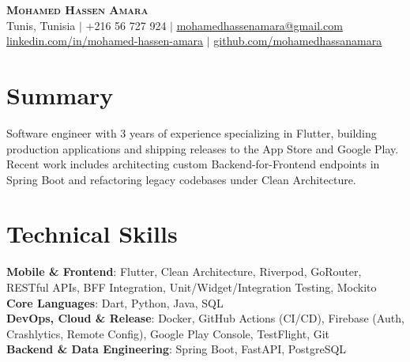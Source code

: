 \documentclass[letterpaper,10pt]{article}
\begin{document}
\begin{center}
    \textbf{\Huge \scshape \textcolor{primaryColor}{Mohamed Hassen Amara}} \\ \vspace{4pt}
    \small
{} Tunis, Tunisia \hspace{1pt}$|$\hspace{1pt}  +216 56 727 924 \hspace{1pt}$|$\hspace{1pt}  \href{mailto:mohamedhassenamara@gmail.com}{\underline{mohamedhassenamara@gmail.com}} \\ \vspace{2pt}
 \href{https://linkedin.com/in/mohamed-hassen-amara}{\underline{linkedin.com/in/mohamed-hassen-amara}} \hspace{1pt}$|$\hspace{1pt}  \href{https://github.com/mohamedhassanamara}{\underline{github.com/mohamedhassanamara}}
\end{center}

\section{Summary}
\small{Software engineer with 3 years of experience specializing in Flutter, building production applications and shipping releases to the App Store and Google Play. Recent work includes architecting custom Backend-for-Frontend endpoints in Spring Boot and refactoring legacy codebases under Clean Architecture.}

\section{Technical Skills}
 \begin{itemize}[leftmargin=0pt, label={}, itemsep=1.5pt, topsep=1pt]
    \small{\item{
     \textbf{Mobile \& Frontend}{: Flutter, Clean Architecture, Riverpod, GoRouter, RESTful APIs, BFF Integration, Unit/Widget/Integration Testing, Mockito} \\
     \textbf{Core Languages}{: Dart, Python, Java, SQL} \\
     \textbf{DevOps, Cloud \& Release}{: Docker, GitHub Actions (CI/CD), Firebase (Auth, Crashlytics, Remote Config), Google Play Console, TestFlight, Git} \\
     \textbf{Backend \& Data Engineering}{: Spring Boot, FastAPI, PostgreSQL}
    }}
 \end{itemize}
\end{document}
